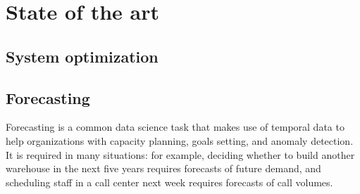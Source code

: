 \documentclass[a4paper]{article} %
\begin{document}
	\section{ State of the art }
	
	\subsection{ System optimization }
	
	\subsection{ Forecasting }
	Forecasting is a common data science task that makes use of temporal data \cite{ForecastingSurvey} to help organizations with capacity planning, goals setting, and anomaly detection. It is required in many situations: for example, deciding whether to build another warehouse in the next five years requires forecasts of future demand, and scheduling staff in a call center next week requires forecasts of call volumes.
	
\end{document}

